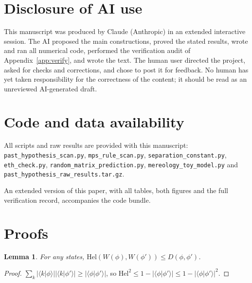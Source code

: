 \documentclass[11pt]{article}
\newtheorem{lemma}[theorem]{Lemma}
\theoremstyle{definition}
\theoremstyle{remark}
\newcommand{\braket}[2]{\langle #1|#2\rangle}
\newcommand{\Hel}{\mathrm{Hel}}
\begin{document}
\section*{Disclosure of AI use}
This manuscript was produced by Claude (Anthropic) in an extended interactive session. The AI proposed the main constructions, proved the stated results, wrote and ran all numerical code, performed the verification audit of Appendix~\ref{app:verify}, and wrote the text. The human user directed the project, asked for checks and corrections, and chose to post it for feedback. No human has yet taken responsibility for the correctness of the content; it should be read as an unreviewed AI-generated draft.

\section*{Code and data availability}\sloppy
All scripts and raw results are provided with this manuscript: \texttt{past\_hypothesis\_scan.py}, \texttt{mps\_rule\_scan.py}, \texttt{separation\_constant.py}, \texttt{eth\_check.py}, \texttt{random\_matrix\_prediction.py}, \texttt{mereology\_toy\_model.py} and \texttt{past\_hypothesis\_raw\_results.tar.gz}.

\noindent An extended version of this paper, with all tables, both figures and the full verification record, accompanies the code bundle.

\appendix
\section{Proofs}
\label{app:proofs}

\begin{lemma}\label{lem:helD}
For any states, $\Hel(W(\phi),W(\phi'))\le D(\phi,\phi')$.
\end{lemma}
\begin{proof}
$\sum_k|\braket{k}{\phi}||\braket{k}{\phi'}|\ge|\braket{\phi}{\phi'}|$, so $\Hel^2\le1-|\braket{\phi}{\phi'}|\le1-|\braket{\phi}{\phi'}|^2$.
\end{proof}
\end{document}
